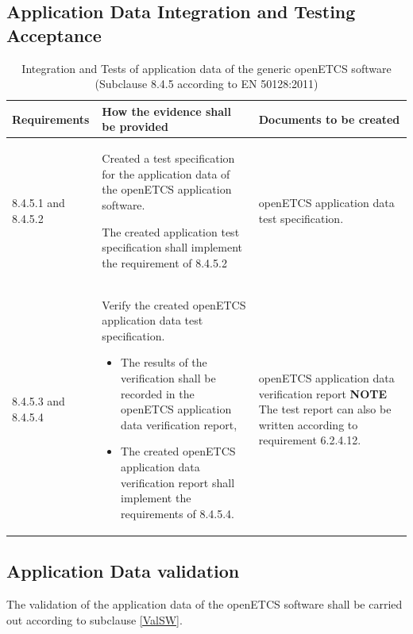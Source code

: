 \documentclass{template/openetcs_report}
\begin{document}
\subsection{Application Data Integration and Testing Acceptance}
{\footnotesize\sffamily\centering
\begin{longtable}{|p{2cm}|p{9cm}|p{3cm}|}
\caption{Integration and Tests of application data of the generic openETCS software (Subclause 8.4.5 according to EN 50128:2011)}\\
\hline
\bfseries Requirements & \bfseries How the evidence shall be provided & \bfseries Documents to be created\\
\hline
\hline
\endhead
\hline
\endfoot

8.4.5.1 and 8.4.5.2 & Created a test specification for the application data of the openETCS application software.

The created application test specification shall implement the requirement of 8.4.5.2
& openETCS application data test specification.\\ 
\hline
8.4.5.3 and 8.4.5.4 & Verify the created openETCS application data test specification.
\begin{itemize}\itemsep=0pt
  \item The results of the verification shall be recorded in the openETCS application data verification report,
  \item The created openETCS application data verification report shall implement the requirements of 8.4.5.4. 
\end{itemize}
& openETCS application data verification report
\linebreak
\linebreak
\textbf{NOTE}\linebreak
The test report can also be written according to requirement 6.2.4.12.\\ 
\hline
\end{longtable}}


\subsection{Application Data validation}
The validation of the application data of the openETCS software shall be carried out according to subclause \ref{ValSW}.
\end{document}

